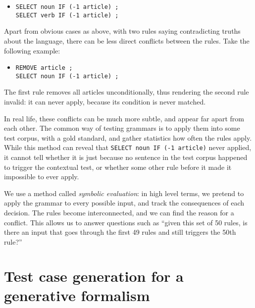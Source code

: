 \begin{itemize}
\item[] \texttt{SELECT noun IF (-1 article) ;} \\ \texttt{SELECT verb IF (-1 article) ;}
\end{itemize}

Apart from obvious cases as above, with two rules saying contradicting truths about the language, there can be less direct conflicts between the rules. Take the following example:

\begin{itemize}
\item[] \texttt{REMOVE article ;} \\ \texttt{SELECT noun IF (-1 article) ;}
\end{itemize}

\noindent The first rule removes all articles unconditionally, thus rendering the second rule invalid: it can never apply, because its condition is never matched.

In real life, these conflicts can be much more subtle, and appear far apart from each other. %
The common way of testing grammars is to apply them into some test corpus, with a gold standard, and gather statistics how often the rules apply. While this method can reveal that \texttt{SELECT noun IF (-1 article)} never applied, it cannot tell whether it is just because no sentence in the test corpus happened to trigger the contextual test, or whether some other rule before it made it impossible to ever apply.

We use a method called \emph{symbolic evaluation}: in high level terms, we pretend to apply the grammar to every possible input, and track the consequences of each decision.
The rules become interconnected, and we can find the reason for a conflict. This allows us to answer questions such as ``given this set of 50 rules, is there an input that goes through the first 49 rules and still triggers the 50th rule?''



\section{Test case generation for a generative formalism}


